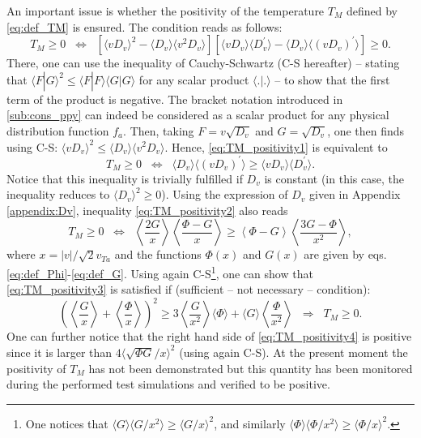 \documentclass[11pt]{article}
\begin{document}
An important issue is whether the positivity of the temperature $T_M$ defined by \cref{eq:def_TM} is ensured. 
The condition reads as follows:
%
\begin{equation} \label{eq:TM_positivity1}
T_M \geq 0 \;\; \Leftrightarrow \;\;
\left[\langle vD_v \rangle^2 - \langle D_v \rangle\langle v^2D_v \rangle \right]
\left[\langle vD_v \rangle\langle D_v^\prime \rangle-\langle D_v \rangle\langle (v D_v)^\prime \rangle\right] \geq0.
\end{equation}
%
There, one can use the inequality of Cauchy-Schwartz (C-S hereafter) -- stating that $\langle F|G \rangle^2 \leq \langle F|F \rangle \langle G|G \rangle$ for any scalar product $\langle .|. \rangle$ -- to show that the first term of the product is negative. The bracket notation introduced in \cref{sub:cons_ppy} can indeed be considered as a scalar product for any physical distribution function $f_a$. Then, taking $F=v\sqrt{D_v}$ and $G=\sqrt{D_v}$, one then finds using C-S: $\langle vD_v \rangle^2 \leq \langle D_v \rangle\langle v^2D_v \rangle$. Hence, \cref{eq:TM_positivity1} is equivalent to
%
\begin{equation} \label{eq:TM_positivity2}
T_M \geq 0 \;\; \Leftrightarrow \;\;
\langle D_v \rangle\langle (v D_v)^\prime \rangle
\geq
\langle vD_v \rangle\langle D_v^\prime \rangle.
\end{equation}
%
Notice that this inequality is trivially fulfilled if $D_v$ is constant (in this case, the inequality reduces to $\langle D_v \rangle^2 \geq 0$).
Using the expression of $D_v$ given in Appendix \ref{appendix:Dv}, inequality \eqref{eq:TM_positivity2} also reads
%
\begin{equation} \label{eq:TM_positivity3}
T_M \geq 0 \;\; \Leftrightarrow \;\;
\left\langle \frac{2G}{x} \right\rangle \left\langle \frac{\Phi-G}{x} \right\rangle 
\geq
\left\langle \Phi-G \right\rangle \left\langle \frac{3G-\Phi}{x^2} \right\rangle ,
\end{equation}
%
where $x = |v|/\sqrt{2}v_{Ta}$ and the functions $\Phi(x)$ and $G(x)$ are given by eqs.\,\eqref{eq:def_Phi}-\eqref{eq:def_G}. Using again C-S\footnote{One notices that $\langle G\rangle \langle G/x^2\rangle \geq \langle G/x\rangle^2$, and similarly $\langle \Phi\rangle \langle \Phi/x^2\rangle \geq \langle \Phi/x\rangle^2$.}, one can show that \cref{eq:TM_positivity3} is satisfied if (sufficient -- not necessary -- condition):
%
\begin{equation} \label{eq:TM_positivity4}
\left(\left\langle \frac{G}{x} \right\rangle + \left\langle \frac{\Phi}{x} \right\rangle \right)^2
\geq
3\left\langle \frac{G}{x^2} \right\rangle \langle \Phi \rangle
+ \langle G \rangle \left\langle \frac{\Phi}{x^2} \right\rangle
\;\; \Rightarrow \;\; T_M \geq 0 .
\end{equation}
%
One can further notice that the right hand side of \cref{eq:TM_positivity4} is positive since it is larger than $4\langle \sqrt{\Phi G}/x \rangle^2$ (using again C-S). At the present moment the positivity of $T_M$ has not been demonstrated but this quantity has been monitored during the performed test simulations and verified to be positive.
\end{document}
